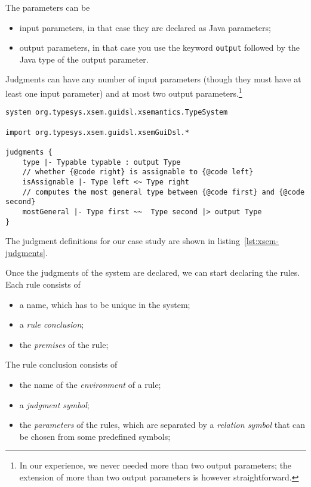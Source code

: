 \noindent
The parameters can be

\begin{itemize}
\item 
input parameters, in that case they are declared as Java parameters;
\item 
output parameters, in that case you use the keyword
\verb|output| followed by the Java
type of the output parameter.
\end{itemize}

Judgments can have any number of input parameters (though they must have at
least one input parameter) and at most two output parameters.\footnote{In our
experience, we never needed more than two output parameters; the extension of
more than two output parameters is however straightforward.}

\begin{lstlisting}[language=xsemantics,float,label=lst:xsem-judgments,caption=Judgment
definitions in Xsemantics]
system org.typesys.xsem.guidsl.xsemantics.TypeSystem

import org.typesys.xsem.guidsl.xsemGuiDsl.*

judgments {
	type |- Typable typable : output Type
	// whether {@code right} is assignable to {@code left}
	isAssignable |- Type left <~ Type right
	// computes the most general type between {@code first} and {@code second}
	mostGeneral |- Type first ~~  Type second |> output Type
}
\end{lstlisting}

\noindent
The judgment definitions for our case study are shown in
listing~\ref{lst:xsem-judgments}.

Once the judgments of the system are declared, we can start declaring the
rules.  Each rule consists of

\begin{itemize}
\item
a name, which has to be unique in the system;
\item
a \textit{rule conclusion};
\item
the \textit{premises} of the rule;
\end{itemize}

\noindent
The rule conclusion consists of

\begin{itemize}
\item
the name of the \textit{environment} of a rule;
\item
a \textit{judgment symbol};
\item
the \textit{parameters} of the rules, which are separated by
a \textit{relation symbol} that can be chosen from some predefined symbols;
\end{itemize}

